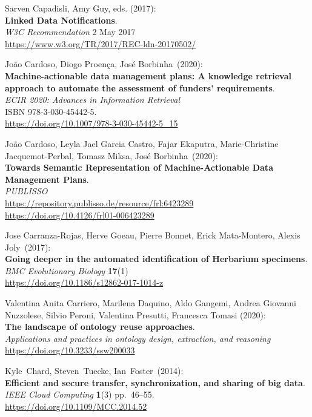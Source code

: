 \begin{thebibliography}{9}
Sarven Capadisli, Amy Guy, eds. (2017): \\
\textbf{Linked Data Notifications}.\\
\emph{W3C Recommendation} 2 May 2017 \\
\url{https://www.w3.org/TR/2017/REC-ldn-20170502/}

João Cardoso, Diogo Proença, José Borbinha~(2020):\\
\textbf{Machine-actionable data management plans: A knowledge retrieval
approach to automate the assessment of funders' requirements}.\\
\emph{ECIR 2020: Advances in Information Retrieval}\\
ISBN 978-3-030-45442-5.\\
\url{https://doi.org/10.1007/978-3-030-45442-5_15}

João Cardoso, Leyla Jael Garcia Castro, Fajar Ekaputra, Marie-Christine Jacquemot-Perbal, Tomasz Miksa, José Borbinha~(2020):\\
\textbf{Towards Semantic Representation of Machine-Actionable Data
Management Plans}.\\
\emph{PUBLISSO}\\
\url{https://repository.publisso.de/resource/frl:6423289}\\
\url{https://doi.org/10.4126/frl01-006423289}

Jose Carranza-Rojas, Herve Goeau, Pierre Bonnet, Erick Mata-Montero, Alexis Joly~(2017):\\
\textbf{Going deeper in the automated identification of Herbarium specimens}.\\
\emph{BMC Evolutionary Biology} \textbf{17}(1)\\
\url{https://doi.org/10.1186/s12862-017-1014-z}

Valentina Anita Carriero, Marilena Daquino, Aldo Gangemi, Andrea
Giovanni Nuzzolese, Silvio Peroni, Valentina Presutti, Francesca
Tomasi (2020): \\
\textbf{The landscape of ontology reuse approaches}. \\
\emph{Applications and practices in ontology design, extraction, and
reasoning} \\
\url{https://doi.org/10.3233/ssw200033}

Kyle~Chard, Steven~Tuecke, Ian~Foster~(2014):\\
\textbf{Efficient and secure transfer, synchronization, and sharing of
big data}.\\
\emph{IEEE Cloud Computing} \textbf{1}(3) pp.~46--55.\\
\url{https://doi.org/10.1109/MCC.2014.52}


\end{thebibliography}
